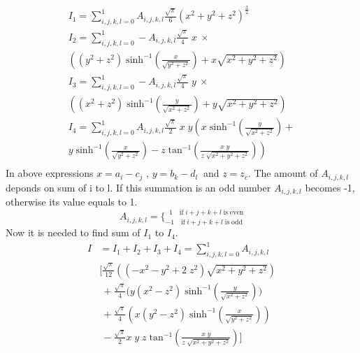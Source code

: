 \documentclass[twoside,twocolumn]{article}
\begin{document}
\begin{equation}\label {eq15}
\begin{array}{lll}

I_1 = \sum_{i,j,k,l=0}^1 A_{i,j,k,l}\frac {\sqrt{\pi} } {6} (x^2+y^2+z^2)^{\frac 3 2}\\
I_2 = \sum_{i,j,k,l=0}^1 -A_{i,j,k,l}\frac {\sqrt{\pi} } {4}\;x\ \times \\
\left((y^2 + z^2) \;\mathrm{sinh^{-1}}(\frac{x}{\sqrt{y^2 + z^2}}) +x \sqrt{x^2 + y^2 + z^2}\right)\\ 
I_3 = \sum_{i,j,k,l=0}^1 -A_{i,j,k,l}\frac {\sqrt{\pi} } {4}\;y\ \times \\
\left((x^2 + z^2)\;\mathrm{sinh^{-1}}(\frac{y}{\sqrt{x^2 + z^2}}) +y \sqrt{x^2 + y^2 + z^2}\right) \\ 
I_4 = \sum_{i,j,k,l=0}^1 A_{i,j,k,l}\frac {\sqrt{\pi} } {2}\;x\;y \left(x\;\mathrm{sinh^{-1}}(\frac{y}{\sqrt{x^2 + z^2}})+ \right.\\
\left. y\;\mathrm{sinh^{-1}}(\frac{x}{\sqrt{y^2 + z^2}}) -z\;\mathrm{tan^{-1}}(\frac{x\;y}{z\;\sqrt{x^2+y^2 + z^2}}) \right)\\ 

\end{array}
\end{equation}
In above expressions $x = a_i - c_j$ , $y = b_k - d_l\ $ and $z = z_c$. The amount of $A_{i,j,k,l}$ deponds on sum of i to l. If this summation is an odd number $A_{i,j,k,l}$ becomes -1, otherwise its value equals to 1.
\begin{equation}\label{eq16}
A_{i,j,k,l} = \Big\{^{\;\;1\quad  \mathrm{if}\; i + j + k + l\; \mathrm{is \;even}}_{-1\quad  \mathrm{if}\; i + j + k + l\; \mathrm{is \;odd}}
\end{equation}
Now it is needed to find sum of $I_1$ to $I_4$.
\begin{equation}\label {eq:17}
\begin{array}{ll}
I&=I_1+I_2+I_3+I_4 = \sum_{i,j,k,l=0}^1 A_{i,j,k,l}\\
&  \bigg[ \frac {\sqrt{\pi} } {12} \left((-x^2-y^2+2\;z^2)\sqrt{x^2 + y^2 + z^2} \right) \\

& \ +  \frac {\sqrt{\pi} } {4} \bigg( y(x^2 - z^2)\;\mathrm{sinh^{-1}}(\frac{y}{\sqrt{x^2 + z^2}}) \bigg)\\
&\ +   \frac {\sqrt{\pi} } {4}\left( x(y^2-z^2)\;\mathrm{sinh^{-1}}(\frac{x}{\sqrt{y^2 + z^2}})  \right)\\ 
&\ -  \frac {\sqrt{\pi} } {2}x \;y\;z\;\mathrm{tan^{-1}}(\frac{x\;y}{z\;\sqrt{x^2+y^2 + z^2}})\bigg]

\end{array}
\end{equation}
\end{document}
